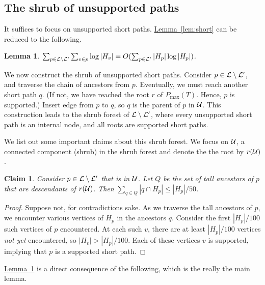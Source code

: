 \documentclass[11pt]{article}
\newtheorem{lemma}[theorem]{Lemma}
\newtheorem{claim}[theorem]{Claim}
\theoremstyle{definition}
\newcommand{\cL}{{\cal L}}
\newcommand{\cU}{{\cal U}}
\newcommand{\Lem}[1]{\hyperref[lem:#1]{Lemma~\ref*{lem:#1}}} %
\newcommand{\pmax}{P_{\max}}
\begin{document}
\subsection{The shrub of unsupported paths} \label{sec:short}



It suffices to focus on unsupported short paths. \Lem{short} can be reduced to the following.

\begin{lemma} \label{lem:support} $\sum_{p \in \cL \setminus \cL'} \sum_{v \in p} \log |H_v| = O(\sum_{p \in \cL'} |H_p| \log |H_p|)$.
\end{lemma}

We now construct the shrub of unsupported short paths. Consider $p \in \cL \setminus \cL'$,
and traverse the chain of ancestors from $p$. Eventually, we must reach another short path $q$.
(If not, we have reached the root $r$ of $\pmax(T)$. Hence, $p$ is supported.)
Insert edge from $p$ to $q$, so $q$ is the parent of $p$ in $\cU$. This construction leads
to the shrub forest of $\cL \setminus \cL'$, where every unsupported short path is an internal node, and all
roots are supported short paths. 

We list out some important claims about this shrub forest.
We focus on $\cU$, a connected component (shrub) in the shrub forest and denote the 
the root by $r(\cU)$.

\begin{claim} \label{clm:loss2} Consider $p \in \cL \setminus \cL'$ that is in $\cU$. Let $Q$
be the set of tall ancestors of $p$ that are descendants of $r(\cU)$. Then $\sum_{q \in Q} |q \cap H_p| \leq |H_p|/50$.
\end{claim}

\begin{proof} Suppose not, for contradictions sake. As we traverse the tall ancestors of $p$,
we encounter various vertices of $H_p$ in the ancestors $q$. Consider the first $|H_p|/100$
such vertices of $p$ encountered. At each such $v$, there are at least $|H_p|/100$
vertices \emph{not yet} encountered, so $|H_v| > |H_p|/100$. Each of these vertices $v$
is supported, implying that $p$ is a supported short path.
\end{proof}

\Lem{support} is a direct consequence of the following,
which is the really the main lemma.

%
\end{document}
